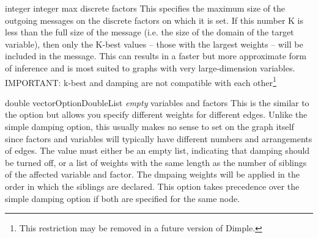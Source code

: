 
{integer}
{integer max}
{discrete factors}
{This specifies the maximum size of the outgoing messages on the discrete factors on which it is set. If this number K is less than the full size of the message (i.e. the size of the domain of the target variable), then only the K-best values -- those with the largest weights -- will be included in the message. This can results in a faster but more approximate form of inference and is most suited to graphs with very large-dimension variables.
\linebreak
\linebreak
IMPORTANT: k-best and damping are not compatible with each other\footnote{This restriction may be removed in a future version of Dimple.}}


{\ifmatlab double vector\fi \ifjava OptionDoubleList\fi}
{\textit{empty}}
{variables and factors}
{This is the similar to the  option but allows you specify different weights for different edges. Unlike the simple damping option, this usually makes no sense to set on the graph itself since factors and variables will typically have different numbers and arrangements of edges. The value must either be an empty list, indicating that damping should be turned off, or a list of weights with the same length as the number of siblings of the affected variable and factor. The dmpaing weights will be applied in the order in which the siblings are declared.
\linebreak
\linebreak
This option takes precedence over the simple damping option if both are specified for the same node.
}


